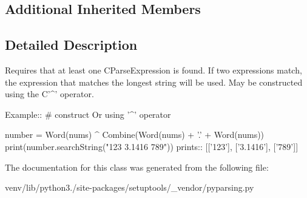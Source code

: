 \subsection*{Additional Inherited Members}


\subsection{Detailed Description}
\begin{DoxyVerb}Requires that at least one C{ParseExpression} is found.
If two expressions match, the expression that matches the longest string will be used.
May be constructed using the C{'^'} operator.

Example::
    # construct Or using '^' operator
    
    number = Word(nums) ^ Combine(Word(nums) + '.' + Word(nums))
    print(number.searchString("123 3.1416 789"))
prints::
    [['123'], ['3.1416'], ['789']]
\end{DoxyVerb}
 

The documentation for this class was generated from the following file\+:\begin{DoxyCompactItemize}
\item 
venv/lib/python3./site-\/packages/setuptools/\+\_\+vendor/pyparsing.\+py\end{DoxyCompactItemize}
